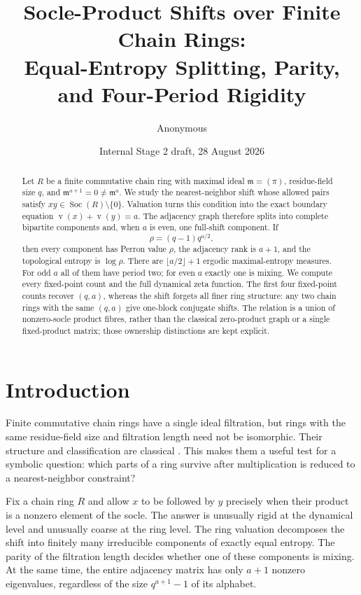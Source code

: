 \documentclass[11pt,a4paper]{amsart}
\title[Chain-ring socle-product shifts]{Socle-Product Shifts over Finite Chain Rings:\\
Equal-Entropy Splitting, Parity, and Four-Period Rigidity}
\author{Anonymous}
\date{Internal Stage 2 draft, 28 August 2026}
\theoremstyle{definition}
\theoremstyle{remark}
\newcommand{\Soc}{\operatorname{Soc}}
\newcommand{\val}{\operatorname{v}}
\begin{document}
\begin{abstract}
Let $R$ be a finite commutative chain ring with maximal ideal
$\mathfrak m=(\pi)$, residue-field size $q$, and
$\mathfrak m^{a+1}=0\ne\mathfrak m^a$.  We study the nearest-neighbor shift
whose allowed pairs satisfy
$xy\in\Soc(R)\setminus\{0\}$.  Valuation turns this condition into the exact
boundary equation $\val(x)+\val(y)=a$.  The adjacency graph therefore splits
into complete bipartite components and, when $a$ is even, one full-shift
component.  If
\[
 \rho=(q-1)q^{a/2},
\]
then every component has Perron value $\rho$, the adjacency rank is $a+1$,
and the topological entropy is $\log\rho$.  There are
$\lfloor a/2\rfloor+1$ ergodic maximal-entropy measures.  For odd $a$ all
of them have period two; for even $a$ exactly one is mixing.  We compute
every fixed-point count and the full dynamical zeta function.  The first four
fixed-point counts recover $(q,a)$, whereas the shift forgets all finer ring
structure: any two chain rings with the same $(q,a)$ give one-block conjugate
shifts.  The relation is a union of nonzero-socle product fibres, rather than
the classical zero-product graph or a single fixed-product matrix; those
ownership distinctions are kept explicit.
\end{abstract}

\maketitle

\section{Introduction}

Finite commutative chain rings have a single ideal filtration, but rings
with the same residue-field size and filtration length need not be
isomorphic.  Their structure and classification are classical
\cite{ClarkLiang1973,Hou2001}.  This makes them a useful test for a symbolic
question: which parts of a ring survive after multiplication is reduced to a
nearest-neighbor constraint?

Fix a chain ring $R$ and allow $x$ to be followed by $y$ precisely when
their product is a nonzero element of the socle.  The answer is unusually
rigid at the dynamical level and unusually coarse at the ring level.  The
ring valuation decomposes the shift into finitely many irreducible components
of exactly equal entropy.  The parity of the filtration length decides
whether one of these components is mixing.  At the same time, the entire
adjacency matrix has only $a+1$ nonzero eigenvalues, regardless of the size
$q^{a+1}-1$ of its alphabet.
\end{document}
